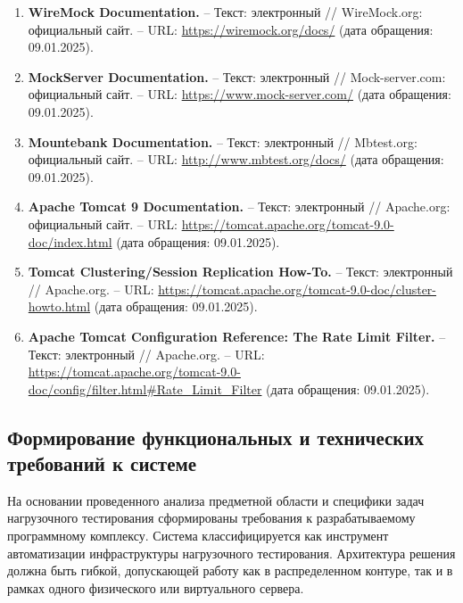 \documentclass[
]{article}
\begin{document}
\begin{enumerate}
\def\labelenumi{\arabic{enumi}.}
\item
  \textbf{WireMock Documentation.} -- Текст: электронный //
  WireMock.org: официальный сайт. -- URL:
  \url{https://wiremock.org/docs/} (дата обращения: 09.01.2025).
\item
  \textbf{MockServer Documentation.} -- Текст: электронный //
  Mock-server.com: официальный сайт. -- URL:
  \url{https://www.mock-server.com/} (дата обращения: 09.01.2025).
\item
  \textbf{Mountebank Documentation.} -- Текст: электронный //
  Mbtest.org: официальный сайт. -- URL:
  \href{https://www.google.com/search?q=http://www.mbtest.org/docs/&authuser=1}{http://www.mbtest.org/docs/}
  (дата обращения: 09.01.2025).
\item
  \textbf{Apache Tomcat 9 Documentation.} -- Текст: электронный //
  Apache.org: официальный сайт. -- URL:
  \url{https://tomcat.apache.org/tomcat-9.0-doc/index.html} (дата
  обращения: 09.01.2025).
\item
  \textbf{Tomcat Clustering/Session Replication How-To.} -- Текст:
  электронный // Apache.org. -- URL:
  \url{https://tomcat.apache.org/tomcat-9.0-doc/cluster-howto.html}
  (дата обращения: 09.01.2025).
\item
  \textbf{Apache Tomcat Configuration Reference: The Rate Limit Filter.}
  -- Текст: электронный // Apache.org. -- URL:
  \href{https://www.google.com/search?q=https://tomcat.apache.org/tomcat-9.0-doc/config/filter.html\%23Rate_Limit_Filter&authuser=1}{https://tomcat.apache.org/tomcat-9.0-doc/config/filter.html\#Rate\_Limit\_Filter}
  (дата обращения: 09.01.2025).
\end{enumerate}

\subsection{Формирование функциональных и технических требований к
системе}\label{ux444ux43eux440ux43cux438ux440ux43eux432ux430ux43dux438ux435-ux444ux443ux43dux43aux446ux438ux43eux43dux430ux43bux44cux43dux44bux445-ux438-ux442ux435ux445ux43dux438ux447ux435ux441ux43aux438ux445-ux442ux440ux435ux431ux43eux432ux430ux43dux438ux439-ux43a-ux441ux438ux441ux442ux435ux43cux435}

На основании проведенного анализа предметной области и специфики задач
нагрузочного тестирования сформированы требования к разрабатываемому
программному комплексу. Система классифицируется как инструмент
автоматизации инфраструктуры нагрузочного тестирования. Архитектура
решения должна быть гибкой, допускающей работу как в распределенном
контуре, так и в рамках одного физического или виртуального сервера.
\end{document}
